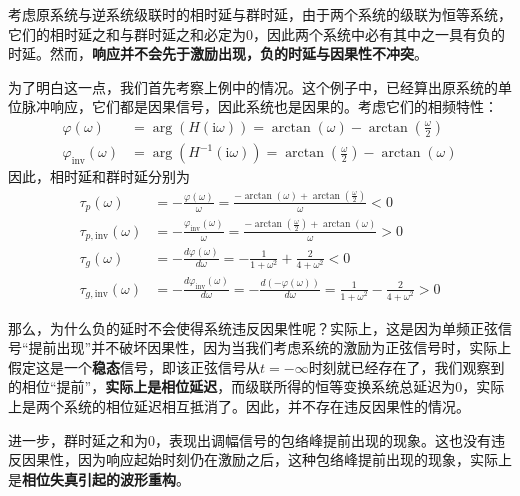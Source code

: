考虑原系统与逆系统级联时的相时延与群时延，由于两个系统的级联为恒等系统，它们的相时延之和与群时延之和必定为0，因此两个系统中必有其中之一具有负的时延。然而，\textbf{响应并不会先于激励出现，负的时延与因果性不冲突}。

为了明白这一点，我们首先考察上例中的情况。这个例子中，已经算出原系统的单位脉冲响应，它们都是因果信号，因此系统也是因果的。考虑它们的相频特性：
\begin{align*}
    \varphi(\omega)&=\arg(H(\mathrm{i}\omega))=\arctan(\omega)-\arctan\left(\frac{\omega}{2}\right)\\
    \varphi_{\mathrm{inv}}(\omega)&=\arg(H^{-1}(\mathrm{i}\omega))=\arctan\left(\frac{\omega}{2}\right)-\arctan(\omega)
\end{align*}
因此，相时延和群时延分别为
\begin{align*}
    \tau_p(\omega)&=-\frac{\varphi(\omega)}{\omega}=\frac{-\arctan(\omega)+\arctan\left(\frac{\omega}{2}\right)}{\omega}<0\\
    \tau_{p,\mathrm{inv}}(\omega)&=-\frac{\varphi_{\mathrm{inv}}(\omega)}{\omega}=\frac{-\arctan\left(\frac{\omega}{2}\right)+\arctan(\omega)}{\omega}>0\\
    \tau_g(\omega)&=-\frac{d\varphi(\omega)}{d\omega}=-\frac{1}{1+\omega^2}+\frac{2}{4+\omega^2}<0\\
    \tau_{g,\mathrm{inv}}(\omega)&=-\frac{d\varphi_{\mathrm{inv}}(\omega)}{d\omega}=-\frac{d(-\varphi(\omega))}{d\omega}=\frac{1}{1+\omega^2}-\frac{2}{4+\omega^2}>0
\end{align*}

那么，为什么负的延时不会使得系统违反因果性呢？实际上，这是因为单频正弦信号“提前出现”并不破坏因果性，因为当我们考虑系统的激励为正弦信号时，实际上假定这是一个\textbf{稳态}信号，即该正弦信号从$t=-\infty$时刻就已经存在了，我们观察到的相位“提前”，\textbf{实际上是相位延迟}，而级联所得的恒等变换系统总延迟为0，实际上是两个系统的相位延迟相互抵消了。因此，并不存在违反因果性的情况。

进一步，群时延之和为0，表现出调幅信号的包络峰提前出现的现象。这也没有违反因果性，因为响应起始时刻仍在激励之后，这种包络峰提前出现的现象，实际上是\textbf{相位失真引起的波形重构}。

